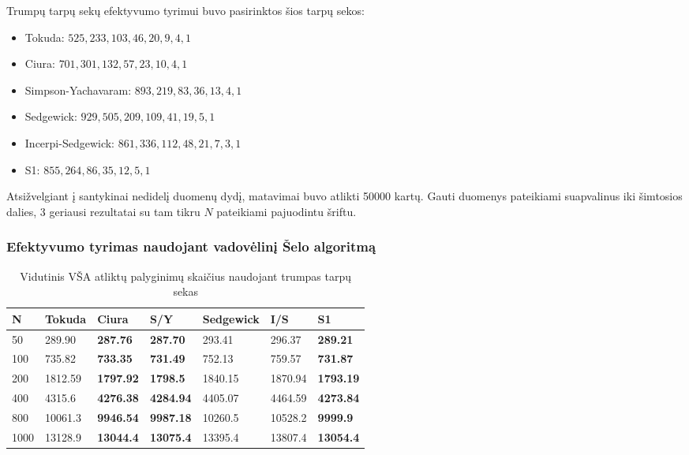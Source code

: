 \documentclass{VUMIFInfKursinis}
\begin{document}
Trumpų tarpų sekų efektyvumo tyrimui buvo pasirinktos šios tarpų sekos:
\begin{itemize}
  \item Tokuda: $525, 233, 103, 46, 20, 9, 4, 1$ \cite{10.5555/645569.659879}
  \item Ciura: $701, 301, 132, 57, 23, 10, 4, 1$ \cite{ciura2001best}
  \item Simpson-Yachavaram: $893, 219, 83, 36, 13, 4, 1$ \cite{simpson1999faster}
  \item Sedgewick: $929, 505, 209, 109, 41, 19, 5, 1$ \cite{SEDGEWICK1986159}
  \item Incerpi-Sedgewick: $861, 336, 112, 48, 21, 7, 3, 1$ \cite{incerpi1985improved}
  \item S1: $855, 264, 86, 35, 12, 5, 1$
\end{itemize}

Atsižvelgiant į santykinai nedidelį duomenų dydį, matavimai buvo atlikti 50000 kartų.
Gauti duomenys pateikiami suapvalinus iki šimtosios dalies,
3 geriausi rezultatai su tam tikru $N$ pateikiami pajuodintu šriftu.

\subsubsection{Efektyvumo tyrimas naudojant vadovėlinį Šelo algoritmą}

\begin{table}[H]
  \caption{Vidutinis VŠA atliktų palyginimų skaičius naudojant trumpas tarpų sekas}
  \label{tss_small_comparisons}
  \begin{tabular}{|l|l|l|l|l|l|l|}
  \hline
  N    & Tokuda  & Ciura            & S/Y              & Sedgewick & I/S     & S1               \\ \hline
  50   & 289.90  & \textbf{287.76}  & \textbf{287.70}  & 293.41    & 296.37  & \textbf{289.21}  \\ \hline
  100  & 735.82  & \textbf{733.35}  & \textbf{731.49}  & 752.13    & 759.57  & \textbf{731.87}  \\ \hline
  200  & 1812.59 & \textbf{1797.92} & \textbf{1798.5}  & 1840.15   & 1870.94 & \textbf{1793.19} \\ \hline
  400  & 4315.6  & \textbf{4276.38} & \textbf{4284.94} & 4405.07   & 4464.59 & \textbf{4273.84} \\ \hline
  800  & 10061.3 & \textbf{9946.54} & \textbf{9987.18} & 10260.5   & 10528.2 & \textbf{9999.9}  \\ \hline
  1000 & 13128.9 & \textbf{13044.4} & \textbf{13075.4} & 13395.4   & 13807.4 & \textbf{13054.4} \\ \hline
  \end{tabular}
\end{table}
\end{document}
